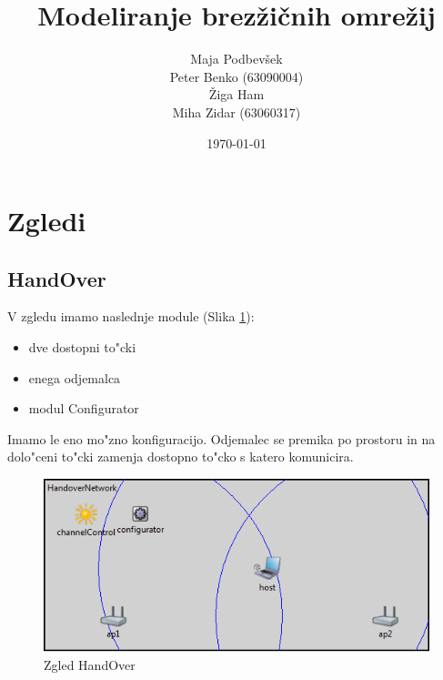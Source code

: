 \documentclass[a4paper,11pt]{article}
\title{Modeliranje brez\v{z}i\v{c}nih omre\v{z}ij}
\author{
    Maja Podbev\v{s}ek\\
    Peter Benko (63090004)\\
    \v{Z}iga Ham\\
    Miha Zidar (63060317)
}
\date{\today}
\begin{document}
\maketitle

\pagebreak

\tableofcontents

\pagebreak

\section{Zgledi}



\subsection{HandOver}

V zgledu imamo naslednje module (Slika \ref{image:handover}):

\begin{itemize}
    \item dve dostopni to"cki
    \item enega odjemalca
    \item modul Configurator
\end{itemize}

Imamo le eno mo"zno konfiguracijo. Odjemalec se premika po prostoru in na dolo"ceni to"cki zamenja dostopno to"cko s katero komunicira. 

\begin{figure}[htbp]
    \begin{center}
        \includegraphics[scale=0.8]{img/zgledi/handover.png}
        \caption{Zgled HandOver}
        \label{image:handover}
    \end{center}
\end{figure}

\end{document}
